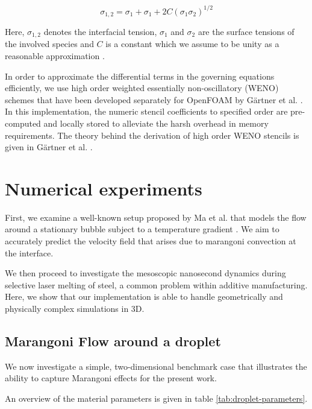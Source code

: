 \documentclass[conference,final]{IEEEtran}
\begin{document}
\begin{equation}
    \sigma_{1,2} = \sigma_1 + \sigma_1 + 2C (\sigma_1 \sigma_2)^{1/2}
\end{equation}

Here, $\sigma_{1,2}$ denotes the interfacial tension, $\sigma_1$ and $\sigma_2$ are the surface tensions of the involved species and $C$ is a constant which we assume to be unity as a reasonable approximation \cite{marmurCorrelatingInterfacialTensions2010}.

In order to approximate the differential terms in the governing equations efficiently, we use high order weighted essentially non-oscillatory (WENO) schemes that have been developed separately for OpenFOAM by Gärtner et al. \cite{gartnerEfficientWENOLibrary2020,martinImplementationValidationSemiImplicit2018}. In this implementation, the numeric stencil coefficients to specified order are pre-computed and locally stored to alleviate the harsh overhead in memory requirements. The theory behind the derivation of high order WENO stencils is given in Gärtner et al. \cite{gartnerEfficientWENOLibrary2020}.

\section{Numerical experiments}

First, we examine a well-known setup proposed by Ma et al. that models the flow around a stationary bubble subject to a temperature gradient \cite{maDirectNumericalSimulation2011}. We aim to accurately predict the velocity field that arises due to marangoni convection at the interface.

We then proceed to investigate the mesoscopic nanosecond dynamics during selective laser melting of steel, a common problem within additive manufacturing. Here, we show that our implementation is able to handle geometrically and physically complex simulations in 3D.


\subsection{Marangoni Flow around a droplet}\label{sec:droplet}

We now investigate a simple, two-dimensional benchmark case that illustrates the ability to capture Marangoni effects for the present work.

An overview of the material parameters is given in table \ref{tab:droplet-parameters}.
\end{document}
